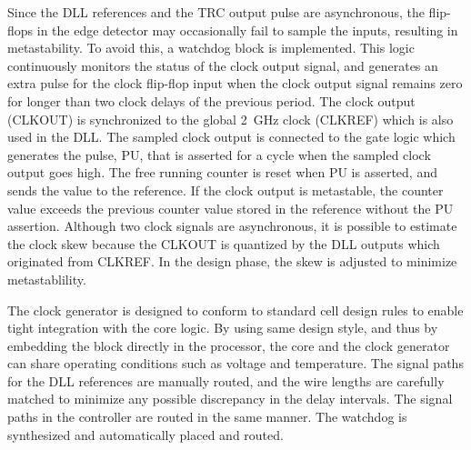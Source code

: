 \documentclass[graybox]{svmult}
\begin{document}
Since the DLL references and the TRC output pulse are asynchronous, the flip-flops in the edge detector may occasionally fail to sample the inputs, resulting in metastability.
To avoid this, a watchdog block is implemented.
This logic continuously monitors the status of the clock output signal, and generates an extra pulse for the clock flip-flop input when the clock output signal remains zero for longer than two clock delays of the previous period.
The clock output (CLKOUT) is synchronized to the global \SI{2}{\giga\hertz} clock (CLKREF) which is also used in the DLL.
The sampled clock output is connected to the gate logic which generates the pulse, PU, that is asserted for a cycle when the sampled clock output goes high.
The free running counter is reset when PU is asserted, and sends the value to the reference.
If the clock output is metastable, the counter value exceeds the previous counter value stored in the reference without the PU assertion.
Although two clock signals are asynchronous, it is possible to estimate the clock skew because the CLKOUT is quantized by the DLL outputs which originated from CLKREF.
In the design phase, the skew is adjusted to minimize metastablility.

The clock generator is designed to conform to standard cell design rules to enable tight integration with the core logic.
By using same design style, and thus by embedding the block directly in the processor, the core and the clock generator can share operating conditions such as voltage and temperature.
The signal paths for the DLL references are manually routed, and the wire lengths are carefully matched to minimize any possible discrepancy in the delay intervals. The signal paths in the controller are routed in the same manner.
The watchdog is synthesized and automatically placed and routed.
\end{document}
